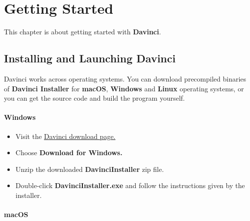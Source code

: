 \chapter{Getting Started}

This chapter is about getting started with \textbf{Davinci}.

\section{Installing and Launching Davinci}

Davinci works across operating systems. You can download precompiled binaries of \textbf{Davinci Installer} for \textbf{macOS}, \textbf{Windows} and \textbf{Linux} operating systems, or you can get the source code and build the program yourself.

\subsubsection{Windows}

\begin{itemize}
	\item Visit the \href{http://davinci.sazonov.org/}{Davinci download page.}
	\item Choose \textbf{Download for Windows.}
	\item Unzip the downloaded \textbf{DavinciInstaller} zip file.
	\item Double-click \textbf{DavinciInstaller.exe} and follow the instructions given by the installer.
\end{itemize}

\subsubsection{macOS}

